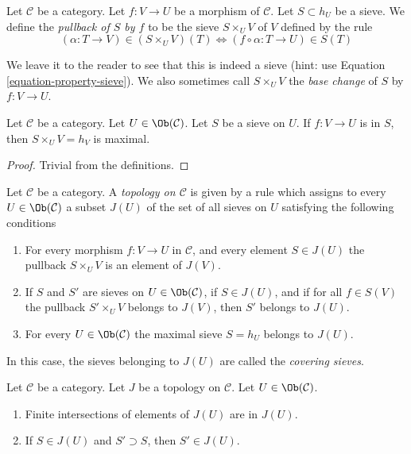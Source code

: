 \begin{definition}
\label{definition-pullback-sieve}
Let $\mathcal{C}$ be a category.
Let $f : V \to U$ be a morphism of $\mathcal{C}$.
Let $S \subset h_U$ be a sieve. We define the
{\it pullback of $S$ by $f$} to be the sieve
$S \times_U V$ of $V$ defined by the rule
$$
(\alpha : T \to V) \in (S \times_U V)(T)
\Leftrightarrow
(f \circ \alpha : T \to U) \in S(T)
$$
\end{definition}

\noindent
We leave it to the reader to see that this is indeed a sieve
(hint: use Equation \ref{equation-property-sieve}).
We also sometimes call $S \times_U V$ the {\it base change}
of $S$ by $f : V \to U$.

\begin{lemma}
\label{lemma-pullback-sieve-section}
Let $\mathcal{C}$ be a category.
Let $U \in \Ob(\mathcal{C})$.
Let $S$ be a sieve on $U$.
If $f : V \to U$ is in $S$, then
$S \times_U V = h_V$ is maximal.
\end{lemma}

\begin{proof}
Trivial from the definitions.
\end{proof}

\begin{definition}
\label{definition-topology}
Let $\mathcal{C}$ be a category. A {\it topology on $\mathcal{C}$} is given
by a rule which assigns to every $U \in \Ob(\mathcal{C})$
a subset $J(U)$ of the set of all sieves on $U$ satisfying
the following conditions
\begin{enumerate}
\item For every morphism $f : V \to U$ in $\mathcal{C}$, and
every element $S \in J(U)$ the pullback $S \times_U V$
is an element of $J(V)$.
\item If $S$ and $S'$ are sieves on $U \in \Ob(\mathcal{C})$,
if $S \in J(U)$, and if for all $f \in S(V)$ the pullback
$S' \times_U V$ belongs to $J(V)$, then $S'$ belongs to $J(U)$.
\item For every $U \in \Ob(\mathcal{C})$ the
maximal sieve $S = h_U$ belongs to $J(U)$.
\end{enumerate}
\end{definition}

\noindent
In this case, the sieves belonging to $J(U)$ are called
the {\it covering sieves}.

\begin{lemma}
\label{lemma-topology-basic}
Let $\mathcal{C}$ be a category.
Let $J$ be a topology on $\mathcal{C}$.
Let $U \in \Ob(\mathcal{C})$.
\begin{enumerate}
\item Finite intersections of elements of $J(U)$ are in $J(U)$.
\item If $S \in J(U)$ and $S' \supset S$, then $S' \in J(U)$.
\end{enumerate}
\end{lemma}

